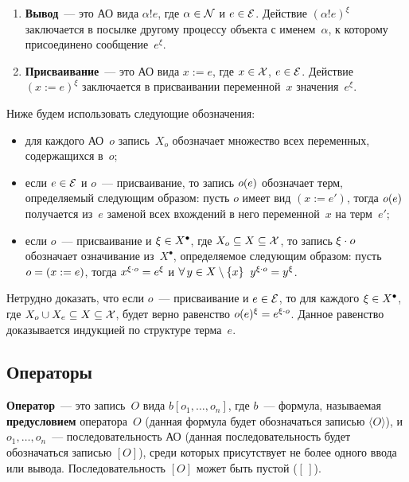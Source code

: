 \begin{multicols}{2}
\begin{enumerate}[1.]
\item {\bf Вывод}~--- это АО вида $\alpha ! e$, где
$\alpha\hm\in  {\cal N}$ и $e \hm\in {\cal E}$.
Действие $(\alpha ! e)^{\xi}$ заключается
в посылке другому процессу объекта с именем~$\alpha$, к которому присоединено
сообщение~$e^\xi$.

\item {\bf Присваивание}~--- это АО вида $x := e$, где $x\hm \in {\cal X}$,
$e \hm\in {\cal E}$. Действие $(x := e)^{\xi}$ заключается
в присваивании переменной~$x$ значения~$e^\xi$.
\end{enumerate}

Ниже  будем использовать следующие обозначения:
\begin{itemize}
\item для каждого АО~$o$ запись~$X_{o}$ обозначает множество
всех переменных, содержащихся в~$o$;
\item если $e\hm\in {\cal E}$ и $o$~--- присваивание, то
запись $o (e)$ обозначает терм, определяемый сле\-ду\-ющим образом: пусть
$o$ имеет вид $(x:=e')$, тогда $o (e)$ получается из~$e$
заменой всех вхождений в него переменной~$x$ на терм~$e'$;
\item если $o$~--- присваивание и  $\xi\hm\in X^\bullet$,
где $X_o\hm\subseteq X\subseteq {\cal X}$, то запись $\xi \cdot o$
обозначает означивание из~$X^\bullet$, определяемое следующим образом:
пусть $o\hm=(x:=e)$, тогда $x^{\deyc{\xi}{o}}\hm= e^\xi$
и $\forall\,y\hm\in X\setminus \{x\}\;\; y^{\deyc{\xi}{o}}\hm= y^\xi$.
\end{itemize}

Нетрудно доказать, что если $o$~--- присваивание и $e\hm\in {\cal E}$,
то для каждого $\xi\hm\in X^\bullet$, где
$X_o\cup X_e\subseteq X\subseteq {\cal X}$,
будет верно равенство $\dey{o}{e}^\xi\hm= e^{\deyc{\xi}{o}}$. Данное равенство
доказывается индукцией по структуре терма~$e$.

\subsection{Операторы}

{\bf Оператор}~--- это запись~$O$ вида $b[o_1, \ldots, o_n]$, где
$b$~--- формула, называемая {\bf предусловием} оператора~$O$ (данная
формула будет обозначаться записью $\langle O \rangle$), и $o_1, \ldots, o_n$~---
последовательность АО (данная последовательность будет обозначаться
записью $[O]$), среди которых присутствует не более одного ввода или
вывода. Последовательность $[O]$ может быть пустой ($[\,]$).


\end{multicols}

